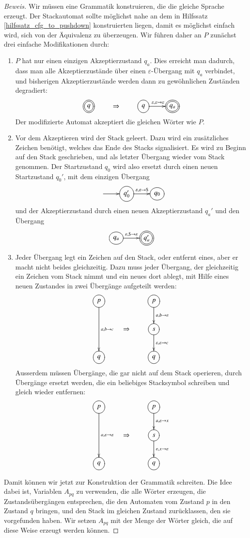 \begin{proof}[Beweis]
Wir müssen eine Grammatik konstruieren, die die gleiche Sprache
erzeugt. Der Stackautomat sollte möglichst nahe an dem in
Hilfssatz \ref{hilfssatz_cfg_to_pushdown} konstruierten liegen, damit es
möglichst einfach wird, sich von der Äquivalenz zu überzeugen.
Wir führen daher an $P$ zunächst drei einfache Modifikationen
durch: 
\begin{enumerate}
\item $P$ hat nur einen einzigen Akzeptierzustand
$q_a$.
Dies erreicht man dadurch, dass man alle Akzeptierzustände über
einen $\varepsilon$-Übergang mit
$q_a$ verbindet, und bisherigen Akzeptierzustände
werden dann zu gewöhnlichen Zuständen degradiert:
\[
\xymatrix{
*++[o][F=]{q}
	&\Rightarrow
		&*++[o][F]{q}\ar[r]^{\varepsilon,\varepsilon\to\varepsilon}
			&*++[o][F=]{q_a}
}		
\]
Der modifizierte Automat akzeptiert die gleichen Wörter wie $P$.
\item Vor dem Akzeptieren wird der Stack geleert. Dazu wird ein zusätzliches
Zeichen benötigt, welches das Ende des Stacks signalisiert. Es wird zu
Beginn auf den Stack geschrieben, und als letzter Übergang wieder
vom Stack genommen. Der Startzustand $q_0$ wird also ersetzt durch einen neuen
Startzustand $q_0'$, mit dem einzigen Übergang 
\[
\entrymodifiers={++[o][F]}
\xymatrix{
*+\txt{}\ar[r]
	&{q_0'}\ar[r]^{\varepsilon,\varepsilon\to {\tt\$}}
		&q_0
}
\]
und der Akzeptierzustand  durch einen neuen Akzeptierzustand $q_a'$ und
den Übergang
\[
\entrymodifiers={++[o][F]}
\xymatrix{
{q_a}\ar[r]^{\varepsilon,{\tt\$}\to\varepsilon}
	&*++[o][F=]{q_a'}
}
\]
\item Jeder Übergang legt ein Zeichen auf den Stack, oder entfernt
eines, aber er macht nicht beides gleichzeitig. Dazu muss jeder Übergang,
der gleichzeitig ein Zeichen vom Stack nimmt und ein neues dort ablegt,
mit Hilfe eines neuen Zustandes in zwei Übergänge aufgeteilt werden:
\[
\xymatrix{
*++[o][F]{p}\ar[dd]^{a,b\to c}
	&*+\txt{}
		&*++[o][F]{p}\ar[d]^{a,b\to\varepsilon}
\\
	&\Rightarrow
		&*++[o][F]{s}\ar[d]^{\varepsilon,\varepsilon\to c}
\\
*++[o][F]{q}
	&
		&*++[o][F]{q}
}
\]
Ausserdem müssen Übergänge, die gar nicht auf dem Stack operieren,
durch Übergänge ersetzt werden, die ein beliebiges Stacksymbol
schreiben und gleich wieder entfernen:
\[
\xymatrix{
*++[o][F]{p}\ar[dd]^{a,\varepsilon\to \varepsilon}
	&*+\txt{}
		&*++[o][F]{p}\ar[d]^{a,\varepsilon\to x}
\\
	&\Rightarrow
		&*++[o][F]{s}\ar[d]^{\varepsilon,x\to \varepsilon}
\\
*++[o][F]{q}
	&
		&*++[o][F]{q}
}
\]
\end{enumerate}
Damit können wir jetzt zur Konstruktion der Grammatik schreiten.
Die Idee dabei ist, Variablen $A_{pq}$ zu verwenden, die alle 
Wörter erzeugen, die Zustandsübergängen entsprechen,
die den Automaten vom Zustand $p$ in den Zustand $q$ bringen,
und den Stack im gleichen Zustand zurücklassen, den sie vorgefunden
haben.
Wir setzen $A_{pq}$ mit der Menge der Wörter gleich, die
auf diese Weise erzeugt werden können.


\end{proof}
